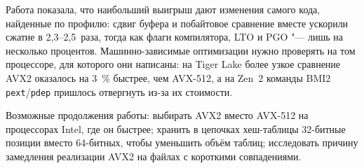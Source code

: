 Работа показала, что наибольший выигрыш дают изменения самого кода,
найденные по профилю: сдвиг буфера и побайтовое сравнение вместе ускорили
сжатие в 2,3--2,5~раза, тогда как флаги компилятора, LTO и PGO "--- лишь на
несколько процентов. Машинно-зависимые оптимизации нужно проверять на том
процессоре, для которого они написаны: на Tiger Lake более узкое
сравнение AVX2 оказалось на 3~\% быстрее, чем AVX-512, а на Zen~2 команды
BMI2 \texttt{pext}/\texttt{pdep} пришлось отвергнуть из-за их стоимости.

Возможные продолжения работы: выбирать AVX2 вместо AVX-512 на процессорах
Intel, где он быстрее; хранить в цепочках хеш-таблицы 32-битные позиции
вместо 64-битных, чтобы уменьшить объём таблиц; исследовать причину
замедления реализации AVX2 на файлах с короткими совпадениями.
